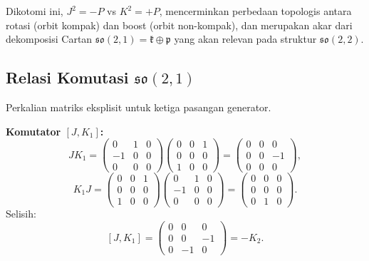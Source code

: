 Dikotomi ini, $J^2 = -P$ vs $K^2 = +P$, mencerminkan perbedaan topologis antara rotasi (orbit kompak) dan boost (orbit non-kompak), dan merupakan akar dari dekomposisi Cartan $\mathfrak{so}(2,1) = \mathfrak{k} \oplus \mathfrak{p}$ yang akan relevan pada struktur $\mathfrak{so}(2,2)$.

\subsection{Relasi Komutasi $\mathfrak{so}(2,1)$}
\label{a2-sec:comm-so21}

Perkalian matriks eksplisit untuk ketiga pasangan generator.

\vspace{0.5em}
\noindent \textbf{Komutator $[J, K_1]$:}
\begin{equation}
    JK_1 = \begin{pmatrix}0&1&0\\-1&0&0\\0&0&0\end{pmatrix}\!\begin{pmatrix}0&0&1\\0&0&0\\1&0&0\end{pmatrix}
    = \begin{pmatrix}0&0&0\\0&0&-1\\0&0&0\end{pmatrix},
\end{equation}
\begin{equation}
    K_1 J = \begin{pmatrix}0&0&1\\0&0&0\\1&0&0\end{pmatrix}\!\begin{pmatrix}0&1&0\\-1&0&0\\0&0&0\end{pmatrix}
    = \begin{pmatrix}0&0&0\\0&0&0\\0&1&0\end{pmatrix}.
\end{equation}
Selisih:
\begin{equation}\label{a2-eq:JK1}
    [J, K_1] = \begin{pmatrix}0&0&0\\0&0&-1\\0&-1&0\end{pmatrix} = -K_2.
\end{equation}

